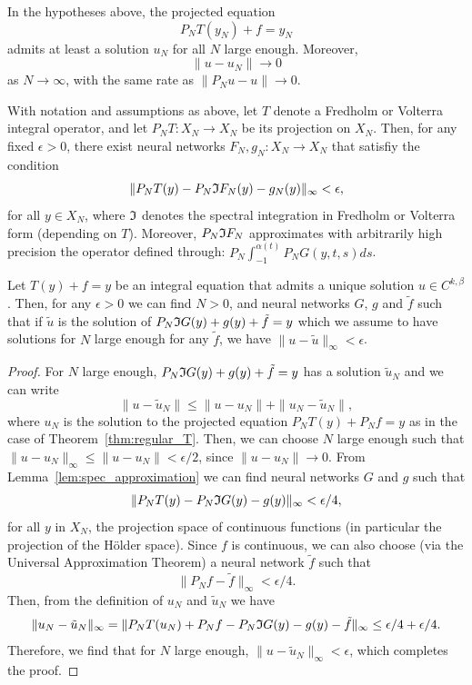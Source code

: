 \documentclass[10pt,a4paper]{amsart}
\begin{document}
	\begin{theorem}\label{thm:regular_T}
		In the hypotheses above, the projected equation 
		$$
		P_NT(y_N) + f = y_N
		$$
		admits at least a solution $u_N$ for all $N$ large enough. Moreover, 
		$$
		\|u - u_N\| \longrightarrow 0
		$$
		as $N \longrightarrow \infty$, with the same rate as $\|P_Nu - u\| \longrightarrow 0$. 
	\end{theorem}

	\begin{lemma}\label{lem:spec_approximation}
		With notation and assumptions as above, let $T$ denote a Fredholm or Volterra integral operator, and let $P_NT : X_N \longrightarrow X_N$ be its projection on $X_N$. Then, for any fixed $\epsilon > 0$, there exist neural networks $F_N, g_N: X_N \longrightarrow X_N$ that satisfiy the condition
		$$
		\|P_NT(y) - P_N \frak I F_N(y) - g_N(y)\|_\infty < \epsilon,
		$$
		for all $y\in X_N$, where $\frak I$ denotes the spectral integration in Fredholm or Volterra form (depending on $T$). Moreover, $P_N \frak I F_N$ approximates with arbitrarily high precision the operator defined through: $P_N\int_{-1}^{\alpha(t)} P_NG(y,t,s)ds$. 
	\end{lemma}

	\begin{theorem}
		Let $T(y) + f = y$ be an integral equation that admits a unique solution $u\in C^{k,\beta}$. Then, for any $\epsilon>0$ we can find $N>0$, and neural networks $G$, $g$ and $\tilde f$ such that if $\tilde u$ is the solution of $P_N\frak I G(y) + g(y) + \tilde f = y$ which we assume to have solutions for $N$ large enough for any $\tilde f$, we have $\|u-\tilde u\|_\infty < \epsilon$.
	\end{theorem}

	\begin{proof}
		For $N$ large enough, $P_N\frak I G(y) + g(y) + \tilde f = y$ has a solution $\tilde u_N$ and we can write 
		$$
		\|u - \tilde u_N\| \leq \|u - u_N\| + \|u_N - \tilde u_N\|,
		$$
		where $u_N$ is the solution to the projected equation $P_NT(y) + P_Nf = y$ as in the case of Theorem~\ref{thm:regular_T}. Then, we can choose $N$ large enough such that $\|u - u_N\|_\infty \leq  \|u - u_N\| < \epsilon/2$, since $\|u-u_N\| \longrightarrow 0$. From Lemma~\ref{lem:spec_approximation} we can find neural networks $G$ and $g$ such that 
		$$
		\|P_NT(y) - P_N \frak I G(y) - g(y)\|_\infty < \epsilon/4,
		$$
		for all $y$ in $X_N$, the projection space of continuous functions (in particular the projection of the H\"{o}lder space). 	Since $f$ is continuous, we can also choose (via the Universal Approximation Theorem) a neural network $\tilde f$ such that
		$$
		\|P_Nf - \tilde f\|_\infty < \epsilon/4. 
		$$
		Then, from the definition of $u_N$ and $\tilde u_N$ we have 
		$$
		\|u_N - \tilde u_N\|_\infty = \|P_NT(u_N) + P_Nf - P_N \frak I G(y) - g(y) - \tilde f\|_\infty \leq \epsilon/4 + \epsilon/4.
		$$
		Therefore, we find that for $N$ large enough, $\|u - \tilde u_N\|_\infty < \epsilon$, which completes the proof. 
	\end{proof}
\end{document}
